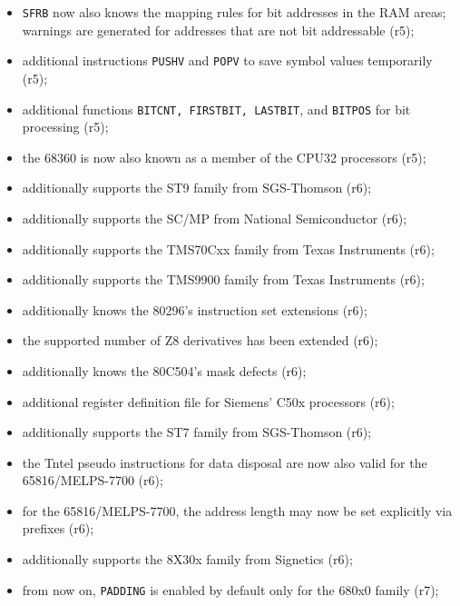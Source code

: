 \documentclass[12pt,twoside]{report}
\newcommand{\tty}[1]{{\tt #1}}
\begin{document}
\begin{itemize}
{\begin{itemize}
{            into a case sensitive mode that differentiates
            between upper and lower case in the names of symbols,
            user-defined functions, macros, macro parameters, and
            sections (r5);}
      \item{\tty{SFRB} now also knows the mapping rules for bit
            addresses in the RAM areas; warnings are generated
            for addresses that are not bit addressable (r5);}
      \item{additional instructions \tty{PUSHV} and \tty{POPV} to save symbol
            values temporarily (r5);}
      \item{additional functions \tty{BITCNT, FIRSTBIT, LASTBIT}, and
            \tty{BITPOS} for bit processing (r5);}
      \item{the 68360 is now also known as a member of the CPU32
            processors (r5);}
      \item{additionally supports the ST9 family from SGS-Thomson
            (r6);}
      \item{additionally supports the SC/MP from National
            Semiconductor (r6);}
      \item{additionally supports the TMS70Cxx family from Texas
            Instruments (r6);}
      \item{additionally supports the TMS9900 family from Texas
            Instruments (r6);}
      \item{additionally knows the 80296's instruction set
            extensions (r6);}
      \item{the supported number of Z8 derivatives has been
            extended (r6);}
      \item{additionally knows the 80C504's mask defects (r6);}
      \item{additional register definition file for Siemens' C50x
            processors (r6);}
      \item{additionally supports the ST7 family from SGS-Thomson
            (r6);}
      \item{the Tntel pseudo instructions for data disposal are
            now also valid for the 65816/MELPS-7700 (r6);}
      \item{for the 65816/MELPS-7700, the address length may now
            be set explicitly via prefixes (r6);}
      \item{additionally supports the 8X30x family from Signetics
            (r6);}
      \item{from now on, \tty{PADDING} is enabled by default only
            for the 680x0 family (r7);}

\end{itemize}}
\end{itemize}
\end{document}
